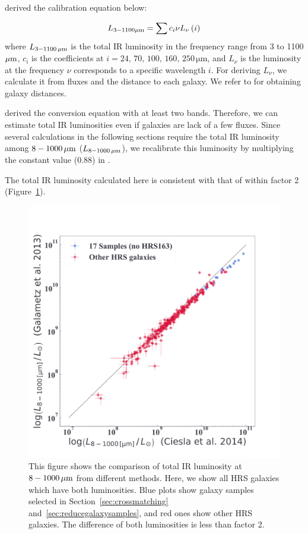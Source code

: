\citet{Galametz2013} derived the calibration equation below:

\begin{equation}\label{eq:galametz}
    L_{\mathrm{3-1100\mathrm{\mu m}}} = \sum c_i \nu L_{\nu}\left(i\right)
\end{equation}
where $L_{\mathrm{3-1100\,\mu m}}$ is the total IR luminosity in the frequency range from 3 to 1100 $\mathrm{\mu m}$, $c_i$ is the coefficients at $i = 24,\,70,\,100,\,160,\,250\,\mathrm{\mu m}$, and $L_{\nu}$ is the luminosity at the frequency $\nu$ corresponds to a specific wavelength $i$.
For deriving $L_{\nu}$, we calculate it from fluxes and the distance to each galaxy.
We refer to \citet{Cortese2012} for obtaining galaxy distances.

\citet{Galametz2013} derived the conversion equation with at least two bands.
Therefore, we can estimate total IR luminosities even if galaxies are lack of a few fluxes.
Since several calculations in the following sections require the total IR luminosity among $8 - 1000\,\mathrm{\mu m}$ ($L_{\mathrm{8-1000\,\mathrm{\mu m}}}$), we recalibrate this luminosity by multiplying the constant value (0.88) in \citet{Takeuchi2005}.

The total IR luminosity calculated here is consistent with that of \citet{Ciesla2014} within factor 2 (Figure~\ref{fig:tircomparison}).

\begin{figure}[htbp]
	\centering
	\includegraphics[width=.7\linewidth]{Chapter_4/Figures/Method_TIRcomparison.pdf}
    \caption[The comparison of total IR luminosities]{\label{fig:tircomparison}
        This figure shows the comparison of total IR luminosity at $8-1000\,\mathrm{\mu m}$ from different methods.
        Here, we show all HRS galaxies which have both luminosities.
        Blue plots show galaxy samples selected in Section~\ref{sec:crossmatching} and~\ref{sec:reducegalaxysamples}, and red ones show other HRS galaxies.
        The difference of both luminosities is less than factor 2.
    }
\end{figure}

